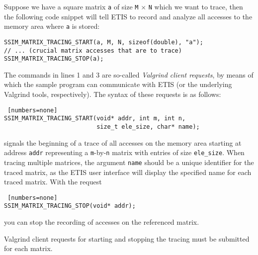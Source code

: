 Suppose we have a square matrix \texttt{a} of size \texttt{M} $\times$ \texttt{N} which we want to trace, then the following code snippet will tell ETIS to record and analyze all accesses to the memory area where \texttt{a} is stored:
\begin{lstlisting}
SSIM_MATRIX_TRACING_START(a, M, N, sizeof(double), "a");
// ... (crucial matrix accesses that are to trace)
SSIM_MATRIX_TRACING_STOP(a);
\end{lstlisting}
The commands in lines 1 and 3 are so-called \emph{Valgrind client requests}, by means of which the sample program can communicate with ETIS (or the underlying Valgrind tools, respectively). The syntax of these requests is as follows:

\begin{lstlisting} [numbers=none]
SSIM_MATRIX_TRACING_START(void* addr, int m, int n, 
                          size_t ele_size, char* name);
\end{lstlisting}
signals the beginning of a trace of all accesses on the memory area starting at address \texttt{addr} representing a \texttt{m}-by-\texttt{n} matrix with entries of size \texttt{ele\_size}. When tracing multiple matrices, the argument \texttt{name} should be a unique identifier for the traced matrix, as the ETIS user interface will display the specified name for each traced matrix.
With the request
\begin{lstlisting} [numbers=none]
SSIM_MATRIX_TRACING_STOP(void* addr);
\end{lstlisting}
you can stop the recording of accesses on the referenced matrix.

Valgrind client requests for starting and stopping the tracing must be submitted for each matrix.

